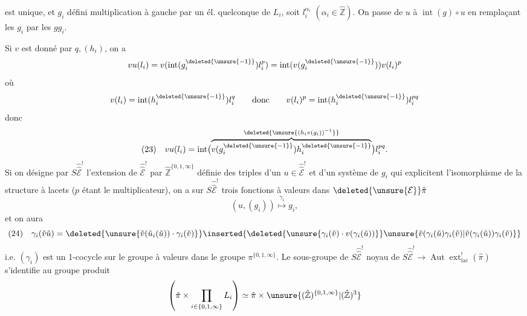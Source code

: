 est unique, et $g_i$ défini  multiplication à gauche par un él. quelconque de $L_i$, soit $l_i^{\alpha_i}$ $(\alpha_i\in\hat{\mathbb Z})$. On passe de $u$ à $\operatorname{int}(g)\circ u$ en  remplaçant les $g_i$ par les $gg_i$.

Si $v$ est donné par $q,(h_i)$, on a
\[
vu(l_i)=v(\operatorname{int}(g_i^{\deleted{\unsure{-1}}})l_i^p)
=\operatorname{int}(v(g_i^{\deleted{\unsure{-1}}}))v(l_i)^p
\]
où
\[
v(l_i)=\operatorname{int}(h_i^{\deleted{\unsure{-1}}})l_i^q
\qquad\text{donc}\qquad v(l_i)^p=\operatorname{int}(h_i^{\deleted{\unsure{-1}}})l_i^{pq}
\]
donc
\[
(23)\quad vu(l_i)=\operatorname{int}\bigl(
\overbrace{v(g_i^{\deleted{\unsure{-1}}})h_i^{\deleted{\unsure{-1}}}}^{\deleted{\unsure{(h_i v(g_i))^{-1}}}}
\bigr)l_i^{pq}.
\]
Si on désigne par $S\widehat{\widehat{\mathcal E}}^!$ l'extension de $\widehat{\widehat{\mathcal E}}^!$ par $\hat{\mathbb Z}^{\{0,1,\infty\}}$ définie   des  triples d'un $u\in\widehat{\widehat{\mathcal E}}^!$ et d'un système de $g_i$ qui explicitent  l'isomorphisme de la structure à lacets ($p$ étant le multiplicateur), on a sur $S\widehat{\widehat{\mathcal E}}^!$ trois fonctions à valeurs dans $\deleted{\unsure{\mathcal E}}\hat\pi$
\[
(u,(g_i))\overset{\gamma_i}{\longmapsto}g_i,
\]
et on aura
\[
(24)\quad\gamma_i(\tilde v\tilde u)
=\deleted{\unsure{\tilde v(\tilde u_i(\tilde u))\cdot\gamma_i(\tilde v)}}
\inserted{\deleted{\unsure{\gamma_i(\tilde v)\cdot v(\gamma_i(\tilde u))}}
\unsure{\tilde v(\gamma_i(\tilde u)\gamma_i(\tilde v)|\tilde v(\gamma_i(\tilde u))\gamma_i(\tilde v)}}
\]
i.e. $(\gamma_i)$ est un 1-cocycle sur le groupe  à valeurs dans le groupe  $\pi^{\{0,1,\infty\}}$.
Le sous-groupe de $S\widehat{\widehat{\mathcal E}}^!$ noyau de $S\widehat{\widehat{\mathcal E}}^!\longrightarrow\operatorname{Aut}\operatorname{ext}_{\mathrm{lac}}^!(\hat\pi)$ s'identifie au groupe produit
\[
\left(\hat\pi\times\prod_{i\in\{0,1,\infty\}}L_i\right)
\simeq\hat\pi\times\unsure{(\hat{\mathbb Z})^{\{0,1,\infty\}}|(\hat{\mathbb Z})^3}
\]
